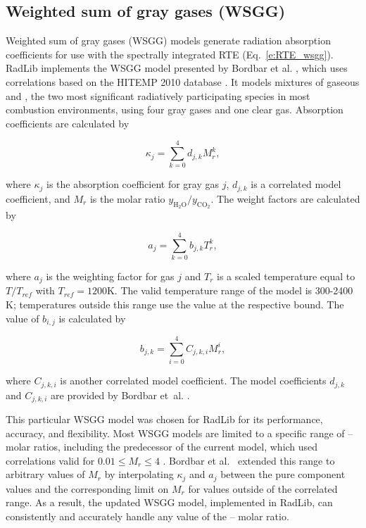 \documentclass[preprint,12pt]{elsarticle}
\begin{document}

\subsection{Weighted sum of gray gases (WSGG)} \label{s:wsgg}

Weighted sum of gray gases (WSGG) models generate radiation absorption coefficients for use with the spectrally integrated RTE (Eq.~\ref{e:RTE_wsgg}).
RadLib implements the WSGG model presented by Bordbar et al. \citep{Bordbar_2014,Bordbar_2020}, which uses correlations based on the HITEMP 2010 database \cite{Rothman_2010}. It models mixtures of gaseous  and , the two most significant radiatively participating species in most combustion environments, using four gray gases and one clear gas. Absorption coefficients are calculated by 
%
\begin{linenomath}
\begin{equation}
    \kappa_j=\sum_{k=0}^{4}d_{j,k}M_r^k,
\end{equation}
\end{linenomath}
%
where $\kappa_j$ is the absorption coefficient for gray gas $j$, $d_{j,k}$ is a correlated model coefficient, and $M_r$ is the molar ratio $y_{\mathrm{H_2O}}/y_{\mathrm{CO_2}}$. The weight factors are calculated by 
%
\begin{linenomath}
\begin{equation}
    a_j=\sum_{k=0}^{4}b_{j,k}T_r^k,
\end{equation}
\end{linenomath}
%
where $a_j$ is the weighting factor for gas $j$ and $T_r$ is a scaled temperature equal to $T/T_{ref}$ with $T_{ref}=1200$K. The valid temperature range of the model is 300-2400 K; temperatures outside this range use the value at the respective bound. The value of $b_{i,j}$ is calculated by 
%
\begin{linenomath}
\begin{equation}
 b_{j,k}=\sum_{i=0}^{4}C_{j,k,i}M_r^i,
\end{equation}
\end{linenomath}
%
where $C_{j,k,i}$ is another correlated model coefficient. The model coefficients $d_{j,k}$ and $C_{j,k,i}$ are provided by Bordbar et~al. \citep{Bordbar_2014,Bordbar_2020}. 

This particular WSGG model was chosen for RadLib for its performance, accuracy, and flexibility. Most WSGG models are limited to a specific range of -- molar ratios, including the predecessor of the current model, which used correlations valid for $0.01\le M_r\le4$ \citep{Bordbar_2014}. Bordbar et al.~\citep{Bordbar_2020} extended this range to arbitrary values of $M_r$ by interpolating $\kappa_j$ and $a_j$ between the pure component values and the corresponding limit on $M_r$ for values outside of the correlated range. As a result, the updated WSGG model, implemented in RadLib, can consistently and accurately handle any value of the -- molar ratio. 
\end{document}
